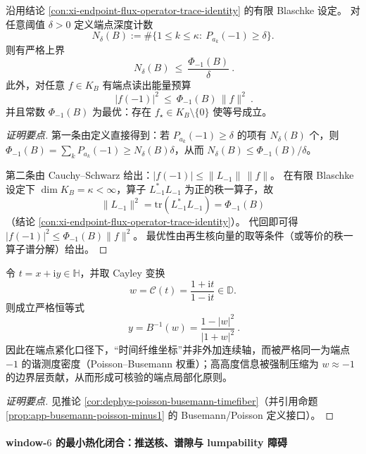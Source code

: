 \begin{conclusion}\label{con:xi-endpoint-flux-sparsity-and-readout-budget}
沿用结论 \ref{con:xi-endpoint-flux-operator-trace-identity} 的有限 Blaschke 设定。
对任意阈值 \(\delta>0\) 定义端点深度计数
\[
N_\delta(B):=\#\{1\le k\le \kappa:\ P_{a_k}(-1)\ge \delta\}.
\]
则有严格上界
\[
\boxed{\ N_\delta(B)\ \le\ \frac{\Phi_{-1}(B)}{\delta}\ }.
\]
此外，对任意 \(f\in K_B\) 有端点读出能量预算
\[
\boxed{\ |f(-1)|^2\ \le\ \Phi_{-1}(B)\,\|f\|^2\ }.
\]
并且常数 \(\Phi_{-1}(B)\) 为最优：存在 \(f_\star\in K_B\setminus\{0\}\) 使等号成立。
\end{conclusion}
\begin{proof}[证明要点]
第一条由定义直接得到：若 \(P_{a_k}(-1)\ge \delta\) 的项有 \(N_\delta(B)\) 个，则
\(
\Phi_{-1}(B)=\sum_k P_{a_k}(-1)\ge N_\delta(B)\delta
\)，从而 \(N_\delta(B)\le \Phi_{-1}(B)/\delta\)。
\par
第二条由 Cauchy--Schwarz 给出：\(|f(-1)|\le \|L_{-1}\|\,\|f\|\)。
在有限 Blaschke 设定下 \(\dim K_B=\kappa<\infty\)，算子 \(L_{-1}^\ast L_{-1}\) 为正的秩一算子，故
\[
\|L_{-1}\|^2=\mathrm{tr}(L_{-1}^\ast L_{-1})=\Phi_{-1}(B)
\]
（结论 \ref{con:xi-endpoint-flux-operator-trace-identity}）。
代回即可得 \(|f(-1)|^2\le \Phi_{-1}(B)\|f\|^2\)。
最优性由再生核向量的取等条件（或等价的秩一算子谱分解）给出。
\end{proof}

\begin{conclusion}\label{con:xi-timefiber-poisson-busemann-identity}
令 \(t=x+\mathrm{i}y\in\mathbb{H}\)，并取 Cayley 变换
\[
w=\mathcal{C}(t)=\frac{1+\mathrm{i}t}{1-\mathrm{i}t}\in\mathbb{D}.
\]
则成立严格恒等式
\[
\boxed{\ y=B^{-1}(w)=\frac{1-|w|^2}{|1+w|^2}\ }.
\]
因此在端点紧化口径下，“时间纤维坐标”并非外加连续轴，而被严格同一为端点 \(-1\) 的谐测度密度（Poisson--Busemann 权重）；高高度信息被强制压缩为 \(w\approx-1\) 的边界层贡献，从而形成可核验的端点局部化原则。
\end{conclusion}
\begin{proof}[证明要点]
见推论 \ref{cor:dephys-poisson-busemann-timefiber}（并引用命题 \ref{prop:app-busemann-poisson-minus1} 的 Busemann/Poisson 定义接口）。
\end{proof}

\paragraph{window-\texorpdfstring{$6$}{6} 的最小热化闭合：推送核、谱隙与 lumpability 障碍}

